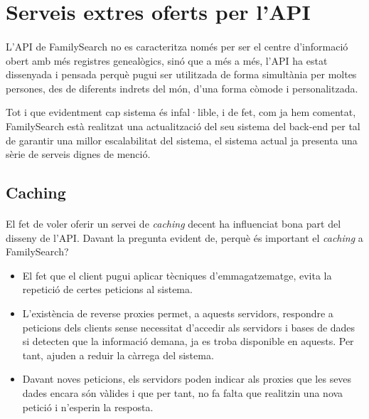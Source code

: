 \section{Serveis extres oferts per l'API}

    \paragraph{}
    L'API de FamilySearch no es caracteritza només per ser el centre d'informació obert amb més registres genealògics, sinó que a més a més, l'API ha estat dissenyada i pensada perquè pugui ser utilitzada de forma simultània per moltes persones, des de diferents indrets del món, d'una forma còmode i personalitzada.

    Tot i que evidentment cap sistema és infal·lible, i de fet, com ja hem comentat, FamilySearch està realitzat una actualització del seu sistema del back-end per tal de garantir una millor escalabilitat del sistema, el sistema actual ja presenta una sèrie de serveis dignes de menció.

    \subsection{Caching}

        \paragraph{}
        El fet de voler oferir un servei de \emph{caching} decent ha influenciat bona part del disseny de l'API. Davant la pregunta evident de, perquè és important el \emph{caching} a FamilySearch?

        \begin{itemize}
            \item El fet que el client pugui aplicar tècniques d'emmagatzematge, evita la repetició de certes peticions al sistema.
            \item L'existència de reverse proxies permet, a aquests servidors, respondre a peticions dels clients sense necessitat d'accedir als servidors i bases de dades si detecten que la informació demana, ja es troba disponible en aquests. Per tant, ajuden a reduir la càrrega del sistema.
            \item Davant noves peticions, els servidors poden indicar als proxies que les seves dades encara són vàlides i que per tant, no fa falta que realitzin una nova petició i n'esperin la resposta.
        \end{itemize}


